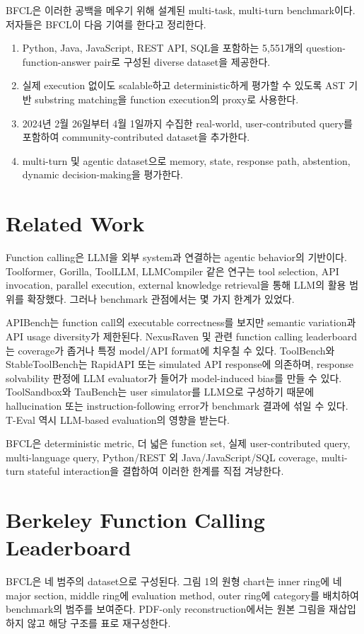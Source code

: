 \documentclass[11pt]{article}
\begin{document}
BFCL은 이러한 공백을 메우기 위해 설계된 multi-task, multi-turn benchmark이다. 저자들은 BFCL이 다음 기여를 한다고 정리한다.
\begin{enumerate}[leftmargin=*]
\item Python, Java, JavaScript, REST API, SQL을 포함하는 5,551개의 question-function-answer pair로 구성된 diverse dataset을 제공한다.
\item 실제 execution 없이도 scalable하고 deterministic하게 평가할 수 있도록 AST 기반 substring matching을 function execution의 proxy로 사용한다.
\item 2024년 2월 26일부터 4월 1일까지 수집한 real-world, user-contributed query를 포함하여 community-contributed dataset을 추가한다.
\item multi-turn 및 agentic dataset으로 memory, state, response path, abstention, dynamic decision-making을 평가한다.
\end{enumerate}

\section{Related Work}
Function calling은 LLM을 외부 system과 연결하는 agentic behavior의 기반이다. Toolformer, Gorilla, ToolLLM, LLMCompiler 같은 연구는 tool selection, API invocation, parallel execution, external knowledge retrieval을 통해 LLM의 활용 범위를 확장했다. 그러나 benchmark 관점에서는 몇 가지 한계가 있었다.

APIBench는 function call의 executable correctness를 보지만 semantic variation과 API usage diversity가 제한된다. NexusRaven 및 관련 function calling leaderboard는 coverage가 좁거나 특정 model/API format에 치우칠 수 있다. ToolBench와 StableToolBench는 RapidAPI 또는 simulated API response에 의존하며, response solvability 판정에 LLM evaluator가 들어가 model-induced bias를 만들 수 있다. ToolSandbox와 TauBench는 user simulator를 LLM으로 구성하기 때문에 hallucination 또는 instruction-following error가 benchmark 결과에 섞일 수 있다. T-Eval 역시 LLM-based evaluation의 영향을 받는다.

BFCL은 deterministic metric, 더 넓은 function set, 실제 user-contributed query, multi-language query, Python/REST 외 Java/JavaScript/SQL coverage, multi-turn stateful interaction을 결합하여 이러한 한계를 직접 겨냥한다.

\section{Berkeley Function Calling Leaderboard}
BFCL은 네 범주의 dataset으로 구성된다. 그림 1의 원형 chart는 inner ring에 네 major section, middle ring에 evaluation method, outer ring에 category를 배치하여 benchmark의 범주를 보여준다. PDF-only reconstruction에서는 원본 그림을 재삽입하지 않고 해당 구조를 표로 재구성한다.
\end{document}

